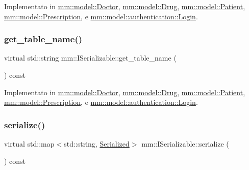 Implementato in \hyperlink{classmm_1_1model_1_1_doctor_a935989cbe2274076c2b409126d4faccd}{mm\+::model\+::\+Doctor}, \hyperlink{classmm_1_1model_1_1_drug_a019770ab95f95f34bbc204c4c3860bfa}{mm\+::model\+::\+Drug}, \hyperlink{classmm_1_1model_1_1_patient_ae85640f3cb3d34bb57e1129ef46a0cbf}{mm\+::model\+::\+Patient}, \hyperlink{classmm_1_1model_1_1_prescription_af521915f8872df18ae4a50ff2a4f59ff}{mm\+::model\+::\+Prescription}, e \hyperlink{structmm_1_1model_1_1authentication_1_1_login_a56f5da26be2d64baa78d0c81d99c8221}{mm\+::model\+::authentication\+::\+Login}.

\mbox{\label{classmm_1_1_i_serializable_a9717e6da47fcbac3ffa2e68152464e0a}} 
\subsubsection{\texorpdfstring{get\+\_\+table\+\_\+name()}{get\_table\_name()}}
{\footnotesize\ttfamily virtual std\+::string mm\+::\+I\+Serializable\+::get\+\_\+table\+\_\+name (\begin{DoxyParamCaption}{ }\end{DoxyParamCaption}) const\hspace{0.3cm}{\ttfamily [pure virtual]}}



Implementato in \hyperlink{classmm_1_1model_1_1_doctor_af4c37e48f9e5ff26f2295678f10afaa3}{mm\+::model\+::\+Doctor}, \hyperlink{classmm_1_1model_1_1_drug_a7fa9dbb569b89f397d4b865b778b3751}{mm\+::model\+::\+Drug}, \hyperlink{classmm_1_1model_1_1_patient_abe79da3e4fabd80e039ae4880dfa76cb}{mm\+::model\+::\+Patient}, \hyperlink{classmm_1_1model_1_1_prescription_a8de9a927dc92c0e0b15dac6f930889e3}{mm\+::model\+::\+Prescription}, e \hyperlink{structmm_1_1model_1_1authentication_1_1_login_afc72adef91be3d97ce4751b8a2357613}{mm\+::model\+::authentication\+::\+Login}.

\mbox{\label{classmm_1_1_i_serializable_a20a59e2324c8dbf6fefe4d11ae89d0fb}} 
\subsubsection{\texorpdfstring{serialize()}{serialize()}}
{\footnotesize\ttfamily virtual std\+::map$<$std\+::string, \hyperlink{structmm_1_1_serialized}{Serialized}$>$ mm\+::\+I\+Serializable\+::serialize (\begin{DoxyParamCaption}{ }\end{DoxyParamCaption}) const\hspace{0.3cm}{\ttfamily [pure virtual]}}



